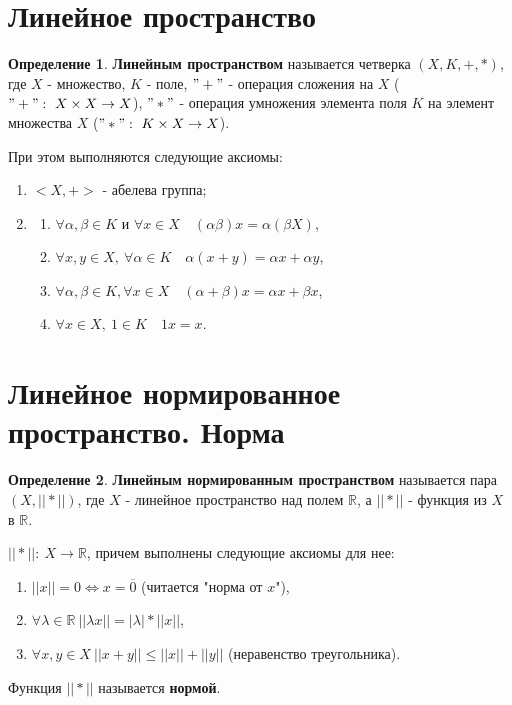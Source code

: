 \documentclass{report}
\theoremstyle{definition}
\newtheorem*{definition}{Определение}
\begin{document}
\section{Линейное пространство}

\begin{definition}
    \textbf{Линейным пространством} называется четверка $(X,K,+,*)$, где $X$ - множество, $K$ - поле, $"+"$ -
    операция сложения на $X$ ($"+": \ X \times X \rightarrow X$), $"*"$ - операция умножения элемента поля $K$
    на элемент множества $X$ ($"*": \ K \times X \rightarrow X$).

    При этом выполняются следующие аксиомы:
    \begin{enumerate}
        \item $<X,+>$ - абелева группа;
        \item
              \begin{enumerate}
                  \item $\forall \alpha,\beta \in K$ и $\forall x \in X \quad (\alpha\beta)x = \alpha(\beta X)$,
                  \item $\forall x,y \in X, \ \forall \alpha \in K \quad \alpha (x+y) = \alpha x + \alpha y$,
                  \item $\forall \alpha,\beta \in K, \forall x \in X \quad (\alpha + \beta)x = \alpha x + \beta x$,
                  \item $\forall x \in X, \ 1 \in K \quad 1x = x$.
              \end{enumerate}
    \end{enumerate}
\end{definition}

\section{Линейное нормированное пространство. Норма}

\begin{definition}
    \textbf{Линейным нормированным пространством} называется пара $(X,||*||)$, где $X$ - линейное пространство
    над полем $\mathbb{R}$, а $||*||$ - функция из $X$ в $\mathbb{R}$.

    $||*||: \ X \rightarrow \mathbb{R}$, причем выполнены следующие аксиомы для нее:
    \begin{enumerate}
        \item $||x|| = 0 \iff x = \overline{0}$ (читается "норма от $x$"),
        \item $\forall \lambda \in \mathbb{R} \ ||\lambda x|| = |\lambda| * ||x||$,
        \item $\forall x,y \in X \ ||x+y|| \leqslant ||x|| + ||y||$ (неравенство треугольника).
    \end{enumerate}
    Функция $||*||$ называется \textbf{нормой}.
\end{definition}
\end{document}
